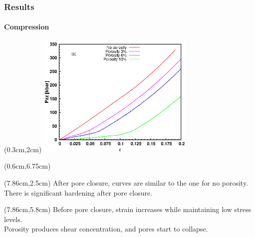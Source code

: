\documentclass[12pt,t]{beamer}
\begin{document}
\begin{frame}
    \frametitle{Results}
    \framesubtitle{Compression}
    \begin{textblock*}{7.5cm}(0.3cm,2cm) %
        \includegraphics[width=7.5cm]{Presentacion_PANACM_Franco/Pzz_strain_comp_dash.eps}
    \end{textblock*}
    \begin{textblock*}{4.2cm}(0.6cm,6.75cm) %
    \end{textblock*}
    \begin{textblock*}{5cm}(7.86cm,2.5cm) %
        After pore closure, curves are similar to the one for no porosity. There is significant hardening after pore closure.
    \end{textblock*}
    \begin{textblock*}{5cm}(7.86cm,5.8cm) %
        Before pore closure, strain increases while maintaining low stress levels.\\
        Porosity produces shear concentration, and pores start to collapse.
    \end{textblock*}
\end{frame}
\end{document}
